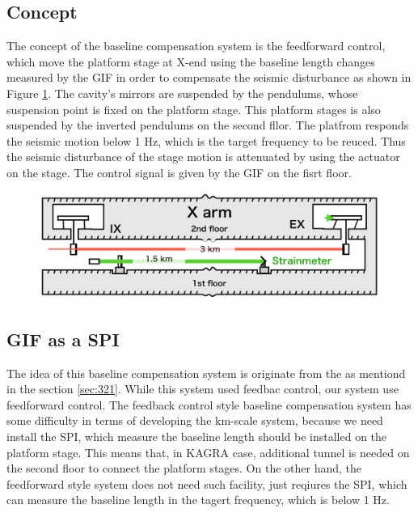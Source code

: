 \subsection{Concept}
The concept of the baseline compensation system is the feedforward control, which move the platform stage at X-end using the baseline length changes measured by the GIF in order to compensate the seismic disturbance as shown in Figure \ref{img:img512}. The cavity's mirrors are suspended by the pendulums, whose suspension point is fixed on the platform stage. This platform stages is also suspended by the inverted pendulums on the second fllor. The platfrom responds the seismic motion below 1 Hz, which is the target frequency to be reuced. Thus the seismic disturbance of the stage motion is attenuated by using the actuator on the stage. The control signal is given by the GIF on the fisrt floor.
\begin{figure}[h]
  \begin{center}   
    \includegraphics[width=14cm]{./img_chap5/img512.png}
    \caption{} \label{img:img512}
  \end{center}
\end{figure}

\subsection{GIF as a SPI}
The idea of this baseline compensation system is originate from the \cite{Numata2008interferometric} as mentiond in the section \ref{sec:321}. While this system used feedbac control, our system use feedforward control. The feedback control style baseline compensation system has some difficulty in terms of developing the km-scale system, because we need install the SPI, which measure the baseline length should be installed on the platform stage. This means that, in KAGRA case, additional tunnel is needed on the second floor to connect the platform stages. On the other hand, the feedforward style system does not need such facility, just reqiures the SPI, which can measure the baseline length in the tagert frequency, which is below 1 Hz.

